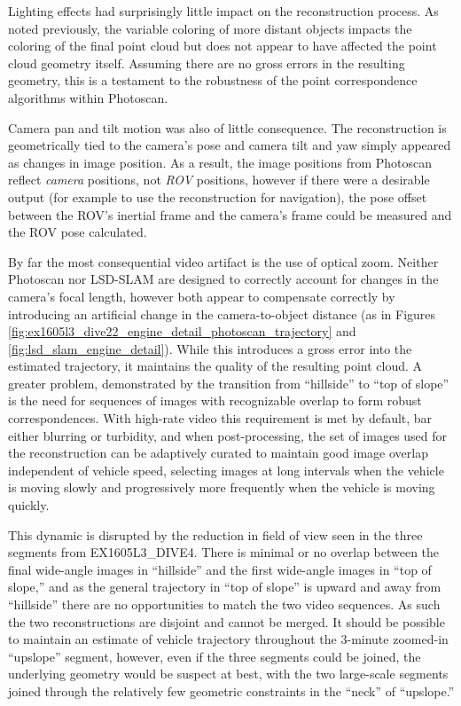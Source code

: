\documentclass[letterpaper,12pt]{article}
\begin{document}
Lighting effects had surprisingly little impact on the reconstruction process.  As noted previously, the variable coloring of more distant objects impacts the coloring of the final point cloud but does not appear to have affected the point cloud geometry itself.   Assuming there are no gross errors in the resulting geometry, this is a testament to the robustness of the point correspondence algorithms within Photoscan.  

Camera pan and tilt motion was also of little consequence.  The reconstruction is geometrically tied to the camera's pose and camera tilt and yaw simply appeared as changes in image position.  As a result, the image positions from Photoscan reflect \textit{camera} positions, not \textit{ROV} positions, however if there were a desirable output (for example to use the reconstruction for navigation), the pose offset between the ROV's inertial frame and the camera's frame could be measured and the ROV pose calculated.

By far the most consequential video artifact is the use of optical zoom.   Neither Photoscan nor LSD-SLAM are designed to correctly account for changes in the camera's focal length, however both appear to compensate correctly by introducing an artificial change in the camera-to-object distance (as in Figures \ref{fig:ex1605l3_dive22_engine_detail_photoscan_trajectory} and \ref{fig:lsd_slam_engine_detail}).   While this introduces a gross error into the estimated trajectory, it maintains the quality of the resulting point cloud.    A greater problem, demonstrated by the transition from ``hillside'' to ``top of slope'' is the need for sequences of images with recognizable overlap to form robust correspondences.  With high-rate video this requirement is met by default, bar either blurring or turbidity, and when post-processing, the set of images used for the reconstruction can be adaptively curated to maintain good image overlap independent of vehicle speed, selecting images at long intervals when the vehicle is moving slowly and progressively more frequently when the vehicle is moving quickly.

This dynamic is disrupted by the reduction in field of view seen in the three segments from EX1605L3\_DIVE4.    There is minimal or no overlap between the final wide-angle images in ``hillside'' and the first wide-angle images in ``top of slope,'' and as the general trajectory in ``top of slope'' is upward and away from ``hillside'' there are no opportunities to match the two video sequences.   As such the two reconstructions are disjoint and cannot be merged.    It should be possible to maintain an estimate of vehicle trajectory throughout the 3-minute zoomed-in ``upslope'' segment, however, even if the three segments could be joined, the underlying geometry would be suspect at best, with the two large-scale segments joined through the relatively few geometric constraints in the ``neck'' of ``upslope.'' 
\end{document}
